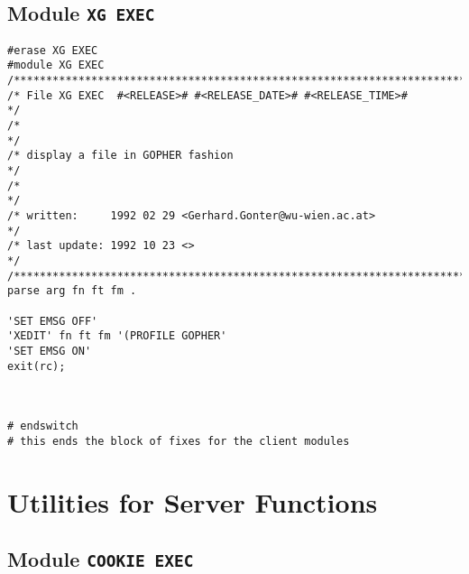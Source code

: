 \subsection{Module {\tt XG EXEC}}

\def\LPtopD{Module {\tt XG EXEC}}

\def\LPtopF{~}

\begin{verbatim}
#erase XG EXEC
#module XG EXEC
/***********************************************************************/
/* File XG EXEC  #<RELEASE># #<RELEASE_DATE># #<RELEASE_TIME>#         */
/*                                                                     */
/* display a file in GOPHER fashion                                    */
/*                                                                     */
/* written:     1992 02 29 <Gerhard.Gonter@wu-wien.ac.at>              */
/* last update: 1992 10 23 <>                                          */
/***********************************************************************/
parse arg fn ft fm .

'SET EMSG OFF' 
'XEDIT' fn ft fm '(PROFILE GOPHER'
'SET EMSG ON'
exit(rc);



# endswitch
# this ends the block of fixes for the client modules
\end{verbatim}

\section{Utilities for Server Functions}

\def\LPtopC{Utilities for Server Functions}

\def\LPtopD{~}

\def\LPtopF{~}

\subsection{Module {\tt COOKIE EXEC}}

\def\LPtopD{Module {\tt COOKIE EXEC}}

\def\LPtopF{~}

